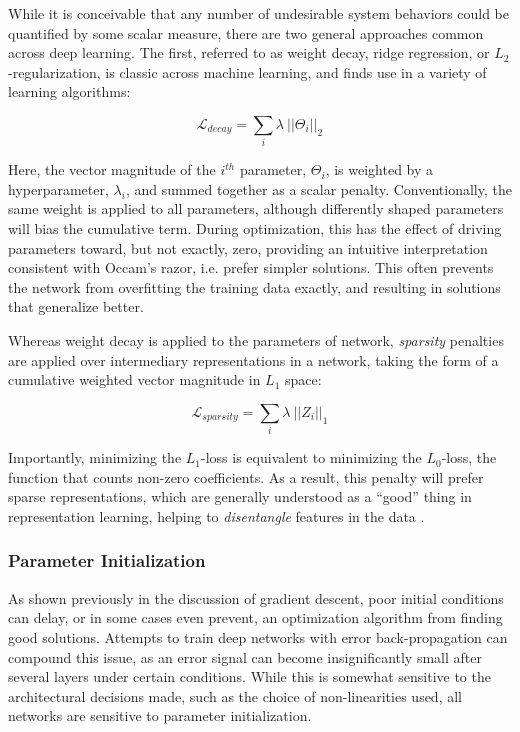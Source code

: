 While it is conceivable that any number of undesirable system behaviors could be quantified by some scalar measure, there are two general approaches common across deep learning.
The first, referred to as weight decay, ridge regression, or $L_2$-regularization, is classic across machine learning, and finds use in a variety of learning algorithms:

\begin{equation}
\mathcal{L}_{decay}=\sum_i\lambda~||\Theta_i||_2
\end{equation}

Here, the vector magnitude of the $i^{th}$ parameter, $\Theta_i$, is weighted by a hyperparameter, $\lambda_i$, and summed together as a scalar penalty.
Conventionally, the same weight is applied to all parameters, although differently shaped parameters will bias the cumulative term.
During optimization, this has the effect of driving parameters toward, but not exactly, zero, providing an intuitive interpretation consistent with Occam's razor, i.e. prefer simpler solutions.
This often prevents the network from overfitting the training data exactly, and resulting in solutions that generalize better.

Whereas weight decay is applied to the parameters of network, \emph{sparsity} penalties are applied over intermediary representations in a network, taking the form of a cumulative weighted vector magnitude in $L_1$ space:

\begin{equation}
\mathcal{L}_{sparsity}=\sum_i\lambda~||Z_i||_1
\end{equation}

Importantly, minimizing the $L_1$-loss is equivalent to minimizing the $L_0$-loss, the function that counts non-zero coefficients.
As a result, this penalty will prefer sparse representations, which are generally understood as a ``good'' thing in representation learning, helping to \emph{disentangle} features in the data \cite{Goodfellow}.


\subsubsection{Parameter Initialization}

As shown previously in the discussion of gradient descent, poor initial conditions can delay, or in some cases even prevent, an optimization algorithm from finding good solutions.
Attempts to train deep networks with error back-propagation can compound this issue, as an error signal can become insignificantly small after several layers under certain conditions.
While this is somewhat sensitive to the architectural decisions made, such as the choice of non-linearities used, all networks are sensitive to parameter initialization.

